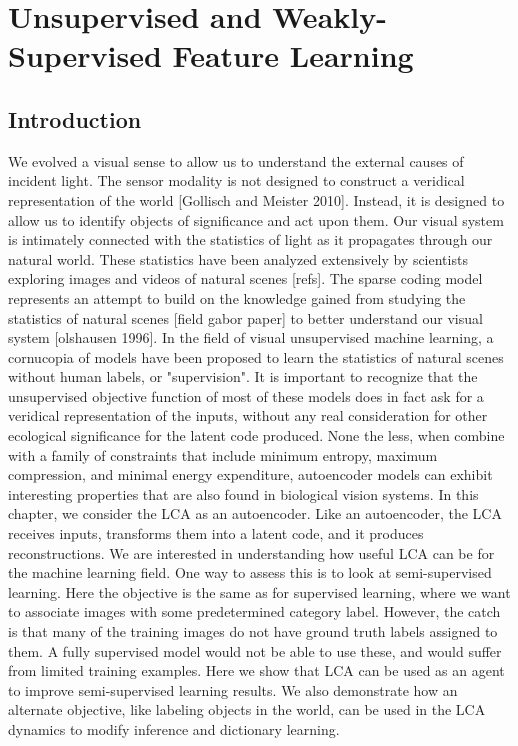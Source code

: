 \chapter{Unsupervised and Weakly-Supervised Feature Learning}

\section{Introduction}

We evolved a visual sense to allow us to understand the external causes of incident light. The sensor modality is not designed to construct a veridical representation of the world [Gollisch and Meister 2010]. Instead, it is designed to allow us to identify objects of significance and act upon them. Our visual system is intimately connected with the statistics of light as it propagates through our natural world. These statistics have been analyzed extensively by scientists exploring images and videos of natural scenes [refs]. The sparse coding model represents an attempt to build on the knowledge gained from studying the statistics of natural scenes [field gabor paper] to better understand our visual system [olshausen 1996]. In the field of visual unsupervised machine learning, a cornucopia of models have been proposed to learn the statistics of natural scenes without human labels, or "supervision". It is important to recognize that the unsupervised objective function of most of these models does in fact ask for a veridical representation of the inputs, without any real consideration for other ecological significance for the latent code produced. None the less, when combine with a family of constraints that include minimum entropy, maximum compression, and minimal energy expenditure, autoencoder models can exhibit interesting properties that are also found in biological vision systems. In this chapter, we consider the LCA as an autoencoder. Like an autoencoder, the LCA receives inputs, transforms them into a latent code, and it produces reconstructions. We are interested in understanding how useful LCA can be for the machine learning field. One way to assess this is to look at semi-supervised learning. Here the objective is the same as for supervised learning, where we want to associate images with some predetermined category label. However, the catch is that many of the training images do not have ground truth labels assigned to them. A fully supervised model would not be able to use these, and would suffer from limited training examples. Here we show that LCA can be used as an agent to improve semi-supervised learning results. We also demonstrate how an alternate objective, like labeling objects in the world, can be used in the LCA dynamics to modify inference and dictionary learning.

